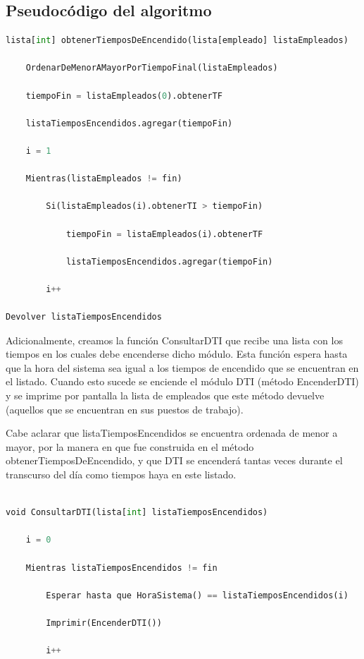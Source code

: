 \documentclass{article}
\begin{document}
\subsection{Pseudocódigo del algoritmo}

\begin{lstlisting}[language=Python, caption=Algoritmo de greddy para tiempos de encendido]
lista[int] obtenerTiemposDeEncendido(lista[empleado] listaEmpleados)

	OrdenarDeMenorAMayorPorTiempoFinal(listaEmpleados)

	tiempoFin = listaEmpleados(0).obtenerTF

    listaTiemposEncendidos.agregar(tiempoFin)

	i = 1

	Mientras(listaEmpleados != fin)

		Si(listaEmpleados(i).obtenerTI > tiempoFin)

			tiempoFin = listaEmpleados(i).obtenerTF

	        listaTiemposEncendidos.agregar(tiempoFin)

		i++

Devolver listaTiemposEncendidos	
\end{lstlisting}    


Adicionalmente, creamos la función ConsultarDTI que recibe una lista con los tiempos en los cuales debe encenderse dicho módulo. 
Esta función espera hasta que la hora del sistema sea igual a los tiempos de encendido que se encuentran en el listado. 
Cuando esto sucede se enciende el módulo DTI (método EncenderDTI) y se imprime por pantalla la lista de empleados que este 
método devuelve (aquellos que se encuentran en sus puestos de trabajo). 

Cabe aclarar que listaTiemposEncendidos se encuentra ordenada de menor a mayor, 
por la manera en que fue construida en el método obtenerTiemposDeEncendido, y que DTI se encenderá tantas veces durante el transcurso del día como tiempos haya en este listado.

\begin{lstlisting}[language=Python, caption=Proceso de consulta a DTI]

void ConsultarDTI(lista[int] listaTiemposEncendidos)

    i = 0
        
    Mientras listaTiemposEncendidos != fin

        Esperar hasta que HoraSistema() == listaTiemposEncendidos(i)

        Imprimir(EncenderDTI())
        
        i++

\end{lstlisting}    
\end{document}
